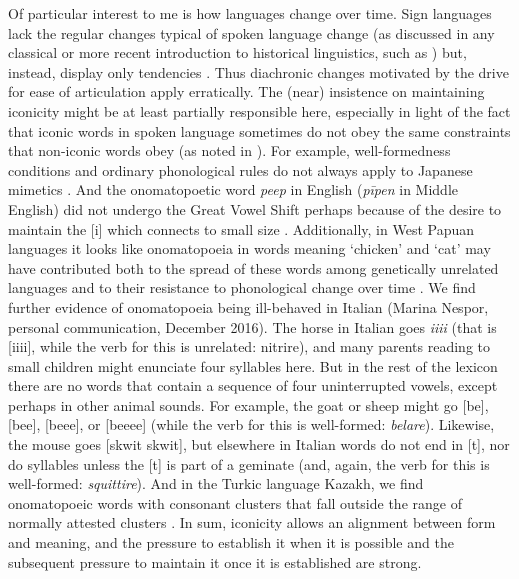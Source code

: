 \documentclass[output=paper,
modfonts
]{LSP/langsci}
\begin{document}
Of particular interest to me is how languages change over time.  Sign languages lack the regular changes typical of spoken language change (as discussed in any classical or more recent introduction to historical linguistics, such as \citealt{anttila1972}) but, instead, display only tendencies \citep{moser1990}.  Thus diachronic changes motivated by the drive for ease of articulation \citep{napoli2014n,sanders2016a,sanders2016b} apply erratically. The (near) insistence on maintaining iconicity might be at least partially responsible here, especially in light of the fact that iconic words in spoken language sometimes do not obey the same constraints that non-iconic words obey (as noted in \citealt{meir2010}).  For example, well-formedness conditions and ordinary phonological rules do not always apply to Japanese mimetics \citep{ito1995}.  And the onomatopoetic word \emph{peep} in English (\emph{pīpen} in Middle English) did not undergo the Great Vowel Shift perhaps because of the desire to maintain the [i] which connects to small size \citep[294]{hock1986}.  Additionally, in West Papuan languages it looks like onomatopoeia in words meaning ‘chicken’ and ‘cat’ may have contributed both to the spread of these words among genetically unrelated languages and to their resistance to phonological change over time \citep{gasser}. We find further evidence of onomatopoeia being ill-behaved in Italian (Marina Nespor, personal communication, December 2016).  The horse in Italian goes \emph{iiii} (that is [iiii], while the verb for this is unrelated:  nitrire), and many parents reading to small children might enunciate four syllables here.  But in the rest of the lexicon there are no words that contain a sequence of four uninterrupted vowels, except perhaps in other animal sounds.  For example, the goat or sheep might go [be], [bee], [beee], or [beeee] (while the verb for this is well-formed: \emph{belare}).   Likewise, the mouse goes [skwit skwit], but elsewhere in Italian words do not end in [t], nor do syllables unless the [t] is part of a geminate (and, again, the verb for this is well-formed: \emph{squittire}).  And in the Turkic language Kazakh, we find onomatopoeic words with consonant clusters that fall outside the range of normally attested clusters \citep{washington}.  In sum, iconicity allows an alignment between form and meaning, and the pressure to establish it when it is possible and the subsequent pressure to maintain it once it is established are strong.  


\printbibliography[heading=subbibliography,notkeyword=this]
\end{document}
